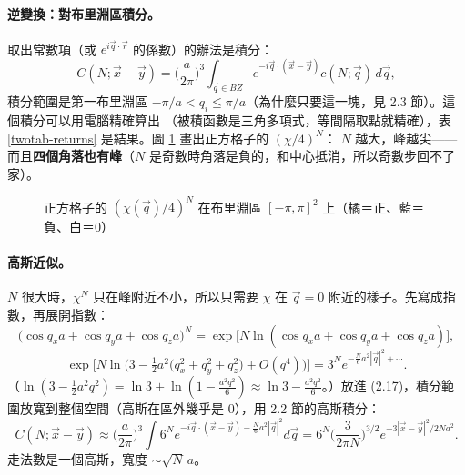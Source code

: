 \paragraph{逆變換：對布里淵區積分。}
取出常數項（或 $e^{i\vec q\cdot\vec r}$ 的係數）的辦法是積分：
\[C(N;\vec x-\vec y)=\Big(\frac{a}{2\pi}\Big)^3\int_{\vec q\in BZ}e^{-i\vec q\cdot(\vec x-\vec y)}c(N;\vec q)\,d\vec q,\tag{2.17}\]
積分範圍是第一布里淵區 $-\pi/a<q_i\le\pi/a$（為什麼只要這一塊，見 2.3 節）。這個積分可以用電腦精確算出
（被積函數是三角多項式，等間隔取點就精確），表 \ref{twotab-returns} 是結果。圖 \ref{twofig-heat} 畫出正方格子的 $(\chi/4)^N$：
$N$ 越大，峰越尖——而且\textbf{四個角落也有峰}（$N$ 是奇數時角落是負的，和中心抵消，所以奇數步回不了家）。
\begin{table}[H]
\centering
\caption{回到原點的走法數 $C(N;\vec0)$（由 (2.17) 的積分與遞迴 (2.7) 兩種算法核對）}\label{twotab-returns}
\TwoTabReturns
\end{table}
\begin{figure}[H]
\centering
\TwoFigHeat
\caption{正方格子的 $(\chi(\vec q)/4)^N$ 在布里淵區 $[-\pi,\pi]^2$ 上（橘＝正、藍＝負、白＝0）}\label{twofig-heat}
\end{figure}

\paragraph{高斯近似。}
$N$ 很大時，$\chi^N$ 只在峰附近不小，所以只需要 $\chi$ 在 $\vec q=0$ 附近的樣子。先寫成指數，再展開指數：
\[\big(\cos q_xa+\cos q_ya+\cos q_za\big)^N=\exp\big[N\ln(\cos q_xa+\cos q_ya+\cos q_za)\big],\tag{2.18}\]
\[\exp\Big[N\ln\Big(3-\tfrac12a^2\big(q_x^2+q_y^2+q_z^2\big)+O(q^4)\Big)\Big]=3^Ne^{-\frac N6a^2|\vec q|^2+\cdots}.\tag{2.19}\]
（$\ln(3-\frac12a^2q^2)=\ln3+\ln(1-\frac{a^2q^2}6)\approx\ln3-\frac{a^2q^2}6$。）放進 (2.17)，積分範圍放寬到整個空間（高斯在區外幾乎是 0），用 2.2 節的高斯積分：
\[C(N;\vec x-\vec y)\approx\Big(\frac a{2\pi}\Big)^3\int6^Ne^{-i\vec q\cdot(\vec x-\vec y)-\frac N6a^2|\vec q|^2}d\vec q=6^N\Big(\frac3{2\pi N}\Big)^{3/2}e^{-3|\vec x-\vec y|^2/2Na^2}.\tag{2.20}\]
走法數是一個高斯，寬度 $\sim\sqrt N\,a$。

